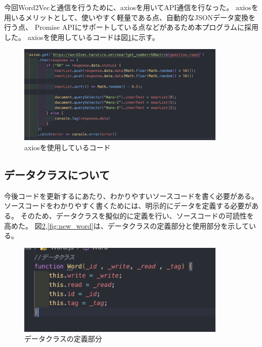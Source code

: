 \documentclass[11pt,a4paper]{jsarticle}
\begin{document}
今回Word2Vecと通信を行うために、axiosを用いてAPI通信を行なった。
axiosを用いるメリットとして、使いやすく軽量である点、自動的なJSONデータ変換を行う点、
Promise APIにサポートしている点などがあるため本プログラムに採用した。
axiosを使用しているコードは図\ref{fig:axios}に示す。


\begin{figure}[htbp]
    \begin{center}
        \includegraphics[width=100mm]{./img/axios.png}
    \end{center}
    \caption{axiosを使用しているコード}
    \label{fig:axios}
\end{figure}



\subsection{データクラスについて}

今後コードを更新するにあたり、わかりやすいソースコードを書く必要がある。
ソースコードをわかりやすく書くためには、明示的にデータを定義する必要がある。
そのため、データクラスを擬似的に定義を行い、ソースコードの可読性を高めた。
図\ref{fig:model},\ref{fig:new_word}は、データクラスの定義部分と使用部分を示している。


\begin{figure}[htbp]
    \begin{center}
        \includegraphics[width=100mm]{./img/model.png}
    \end{center}
    \caption{データクラスの定義部分}
    \label{fig:model}
\end{figure}
\end{document}
